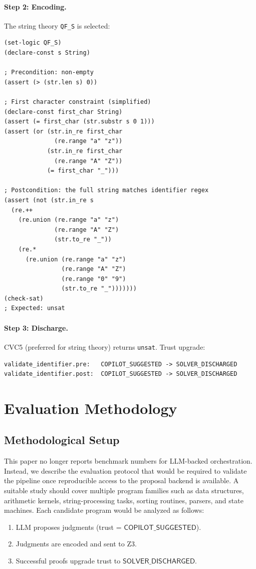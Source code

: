 \documentclass[11pt]{article}
\newcommand{\CopilotSugg}{\ensuremath{\mathsf{COPILOT\_SUGGESTED}}}
\newcommand{\SolverDisch}{\ensuremath{\mathsf{SOLVER\_DISCHARGED}}}
\begin{document}
\paragraph{Step 2: Encoding.}
The string theory \texttt{QF\_S} is selected:
\begin{lstlisting}[style=jugeo-output]
(set-logic QF_S)
(declare-const s String)

; Precondition: non-empty
(assert (> (str.len s) 0))

; First character constraint (simplified)
(declare-const first_char String)
(assert (= first_char (str.substr s 0 1)))
(assert (or (str.in_re first_char
              (re.range "a" "z"))
            (str.in_re first_char
              (re.range "A" "Z"))
            (= first_char "_")))

; Postcondition: the full string matches identifier regex
(assert (not (str.in_re s
  (re.++
    (re.union (re.range "a" "z")
              (re.range "A" "Z")
              (str.to_re "_"))
    (re.*
      (re.union (re.range "a" "z")
                (re.range "A" "Z")
                (re.range "0" "9")
                (str.to_re "_")))))))
(check-sat)
; Expected: unsat
\end{lstlisting}

\paragraph{Step 3: Discharge.}
CVC5 (preferred for string theory) returns \texttt{unsat}.
Trust upgrade:
\begin{lstlisting}[style=jugeo-output]
validate_identifier.pre:   COPILOT_SUGGESTED -> SOLVER_DISCHARGED
validate_identifier.post:  COPILOT_SUGGESTED -> SOLVER_DISCHARGED
\end{lstlisting}

\section{Evaluation Methodology}\label{sec:evaluation}

\subsection{Methodological Setup}
This paper no longer reports benchmark numbers for LLM-backed
orchestration.  Instead, we describe the evaluation protocol that would be
required to validate the pipeline once reproducible access to the proposal
backend is available.  A suitable study should cover multiple program
families such as data structures, arithmetic kernels, string-processing
tasks, sorting routines, parsers, and state machines.  Each candidate
program would be analyzed as follows:
\begin{enumerate}[noitemsep]
  \item LLM proposes judgments (trust = \CopilotSugg).
  \item Judgments are encoded and sent to Z3.
  \item Successful proofs upgrade trust to \SolverDisch.
\end{enumerate}
\end{document}
